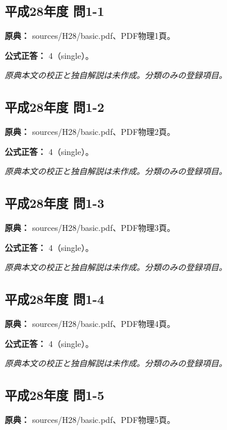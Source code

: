 \subsection{平成28年度 問1-1}
\label{q:h28-reg-basic-1-1}

\noindent\textbf{原典：} sources/H28/basic.pdf、PDF物理1頁。

\textbf{公式正答：} 4（single）。

\par\textit{原典本文の校正と独自解説は未作成。分類のみの登録項目。}

\subsection{平成28年度 問1-2}
\label{q:h28-reg-basic-1-2}

\noindent\textbf{原典：} sources/H28/basic.pdf、PDF物理2頁。

\textbf{公式正答：} 4（single）。

\par\textit{原典本文の校正と独自解説は未作成。分類のみの登録項目。}

\subsection{平成28年度 問1-3}
\label{q:h28-reg-basic-1-3}

\noindent\textbf{原典：} sources/H28/basic.pdf、PDF物理3頁。

\textbf{公式正答：} 4（single）。

\par\textit{原典本文の校正と独自解説は未作成。分類のみの登録項目。}

\subsection{平成28年度 問1-4}
\label{q:h28-reg-basic-1-4}

\noindent\textbf{原典：} sources/H28/basic.pdf、PDF物理4頁。

\textbf{公式正答：} 4（single）。

\par\textit{原典本文の校正と独自解説は未作成。分類のみの登録項目。}

\subsection{平成28年度 問1-5}
\label{q:h28-reg-basic-1-5}

\noindent\textbf{原典：} sources/H28/basic.pdf、PDF物理5頁。

